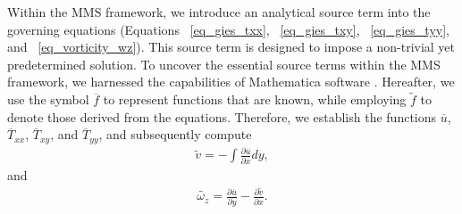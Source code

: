 \documentclass[preprint, 12pt]{elsarticle}
\begin{document}
Within the MMS framework, we introduce an analytical source term into the governing equations (Equations ~\eqref{eq_gies_txx}, ~\eqref{eq_gies_txy}, ~\eqref{eq_gies_tyy}, and ~\eqref{eq_vorticity_wz}). This source term is designed to impose a non-trivial yet predetermined solution. To uncover the essential source terms within the MMS framework, we harnessed the capabilities of Mathematica software \cite{Mathematica}. Hereafter, we use the symbol $\overline{f}$ to represent functions that are known, while employing $\widetilde{f}$ to denote those derived from the equations. Therefore, we establish the functions $\overline{u}$, $\overline{T}_{xx}$, $\overline{T}_{xy}$, and $\overline{T}_{yy}$, and subsequently compute
\begin{gather}
    \widetilde{v} = - \int \frac{\partial \overline{u}}{\partial x}dy,\label{MMS_v_linha}
\end{gather}
and
\begin{gather}
    \widetilde{\omega_z}=\frac{\partial \overline{u}}{\partial y}-\frac{\partial \widetilde{v}}{\partial x}.\label{vortic_corrent_uv_linha}
\end{gather}
\end{document}
